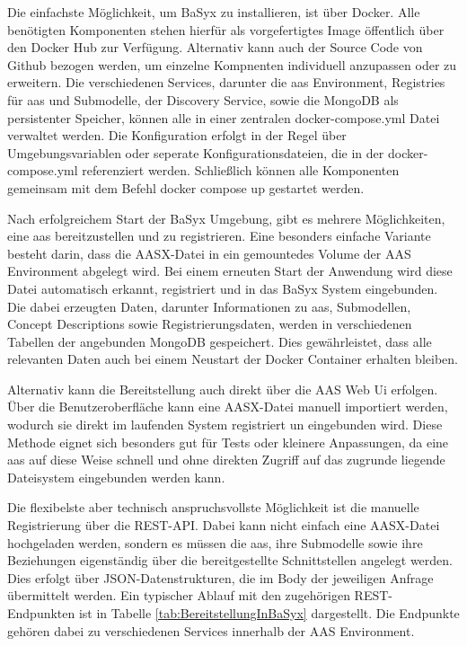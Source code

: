 Die einfachste Möglichkeit, um BaSyx zu installieren, ist über Docker.
Alle benötigten Komponenten stehen hierfür als vorgefertigtes Image öffentlich über den Docker Hub zur Verfügung.
Alternativ kann auch der Source Code von Github bezogen werden, um einzelne Kompnenten individuell anzupassen oder zu erweitern.
Die verschiedenen Services, darunter die \acs{aas} Environment, Registries für \acs{aas} und Submodelle, der Discovery Service, sowie die MongoDB als persistenter Speicher, können alle in einer zentralen docker-compose.yml Datei verwaltet werden.
Die Konfiguration erfolgt in der Regel über Umgebungsvariablen oder seperate Konfigurationsdateien, die in der docker-compose.yml referenziert werden.
Schließlich können alle Komponenten gemeinsam mit dem Befehl docker compose up gestartet werden.

Nach erfolgreichem Start der BaSyx Umgebung, gibt es mehrere Möglichkeiten, eine \acs{aas} bereitzustellen und zu registrieren.
Eine besonders einfache Variante besteht darin, dass die AASX-Datei in ein gemountedes Volume der AAS Environment abgelegt wird.
Bei einem erneuten Start der Anwendung wird diese Datei automatisch erkannt, registriert und in das BaSyx System eingebunden.
Die dabei erzeugten Daten, darunter Informationen zu \acs{aas}, Submodellen, Concept Descriptions sowie Registrierungsdaten, werden in verschiedenen Tabellen der angebunden MongoDB gespeichert.
Dies gewährleistet, dass alle relevanten Daten auch bei einem Neustart der Docker Container erhalten bleiben.

Alternativ kann die Bereitstellung auch direkt über die AAS Web Ui erfolgen.
Über die Benutzeroberfläche kann eine AASX-Datei manuell importiert werden, wodurch sie direkt im laufenden System registriert un eingebunden wird.
Diese Methode eignet sich besonders gut für Tests oder kleinere Anpassungen, da eine \acs{aas} auf diese Weise schnell und ohne direkten Zugriff auf das zugrunde liegende Dateisystem eingebunden werden kann.

Die flexibelste aber technisch anspruchsvollste Möglichkeit ist die manuelle Registrierung über die REST-API. 
Dabei kann nicht einfach eine AASX-Datei hochgeladen werden, sondern es müssen die \acs{aas}, ihre Submodelle sowie ihre Beziehungen eigenständig über die bereitgestellte Schnittstellen angelegt werden.
Dies erfolgt über JSON-Datenstrukturen, die im Body der jeweiligen Anfrage übermittelt werden.
Ein typischer Ablauf mit den zugehörigen REST-Endpunkten ist in Tabelle \ref{tab:BereitstellungInBaSyx} dargestellt.
Die Endpunkte gehören dabei zu verschiedenen Services innerhalb der AAS Environment.

